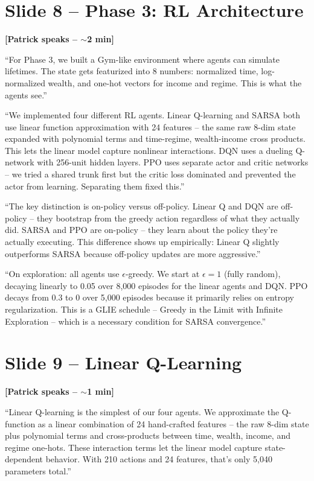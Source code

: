 \documentclass[11pt, letterpaper]{article}
\begin{document}
\section{Slide 8 -- Phase 3: RL Architecture}

\textbf{[Patrick speaks -- $\sim$2 min]}

``For Phase 3, we built a Gym-like environment where agents can simulate lifetimes. The state gets featurized into 8 numbers: normalized time, log-normalized wealth, and one-hot vectors for income and regime. This is what the agents see.''

``We implemented four different RL agents. Linear Q-learning and SARSA both use linear function approximation with 24 features -- the same raw 8-dim state expanded with polynomial terms and time-regime, wealth-income cross products. This lets the linear model capture nonlinear interactions. DQN uses a dueling Q-network with 256-unit hidden layers. PPO uses separate actor and critic networks -- we tried a shared trunk first but the critic loss dominated and prevented the actor from learning. Separating them fixed this.''

``The key distinction is on-policy versus off-policy. Linear Q and DQN are off-policy -- they bootstrap from the greedy action regardless of what they actually did. SARSA and PPO are on-policy -- they learn about the policy they're actually executing. This difference shows up empirically: Linear Q slightly outperforms SARSA because off-policy updates are more aggressive.''

``On exploration: all agents use $\epsilon$-greedy. We start at $\epsilon = 1$ (fully random), decaying linearly to 0.05 over 8,000 episodes for the linear agents and DQN. PPO decays from 0.3 to 0 over 5,000 episodes because it primarily relies on entropy regularization. This is a GLIE schedule -- Greedy in the Limit with Infinite Exploration -- which is a necessary condition for SARSA convergence.''

\section{Slide 9 -- Linear Q-Learning}

\textbf{[Patrick speaks -- $\sim$1 min]}

``Linear Q-learning is the simplest of our four agents. We approximate the Q-function as a linear combination of 24 hand-crafted features -- the raw 8-dim state plus polynomial terms and cross-products between time, wealth, income, and regime one-hots. These interaction terms let the linear model capture state-dependent behavior. With 210 actions and 24 features, that's only 5,040 parameters total.''
\end{document}
